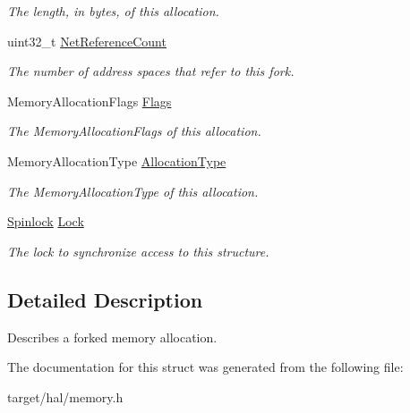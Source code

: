 \begin{DoxyCompactItemize}
\begin{DoxyCompactList}\small\item\em The length, in bytes, of this allocation. \end{DoxyCompactList}\item 
uint32\+\_\+t \hyperlink{structForkedMemoryData_a80dff83c77a4bc3c06adf45d527a60ca}{Net\+Reference\+Count}\hypertarget{structForkedMemoryData_a80dff83c77a4bc3c06adf45d527a60ca}{}\label{structForkedMemoryData_a80dff83c77a4bc3c06adf45d527a60ca}

\begin{DoxyCompactList}\small\item\em The number of address spaces that refer to this fork. \end{DoxyCompactList}\item 
Memory\+Allocation\+Flags \hyperlink{structForkedMemoryData_ac5805d0bfa244478530b93b81ca6978c}{Flags}\hypertarget{structForkedMemoryData_ac5805d0bfa244478530b93b81ca6978c}{}\label{structForkedMemoryData_ac5805d0bfa244478530b93b81ca6978c}

\begin{DoxyCompactList}\small\item\em The Memory\+Allocation\+Flags of this allocation. \end{DoxyCompactList}\item 
Memory\+Allocation\+Type \hyperlink{structForkedMemoryData_ab72120a66547e9d89b0b2afaf4815f26}{Allocation\+Type}\hypertarget{structForkedMemoryData_ab72120a66547e9d89b0b2afaf4815f26}{}\label{structForkedMemoryData_ab72120a66547e9d89b0b2afaf4815f26}

\begin{DoxyCompactList}\small\item\em The Memory\+Allocation\+Type of this allocation. \end{DoxyCompactList}\item 
\hyperlink{group__sync__hal_ga2b7bd1f01b65ccbfaee98f004746ae8b}{Spinlock} \hyperlink{structForkedMemoryData_a848f24734eb0c95d865ee9f336dad2d1}{Lock}\hypertarget{structForkedMemoryData_a848f24734eb0c95d865ee9f336dad2d1}{}\label{structForkedMemoryData_a848f24734eb0c95d865ee9f336dad2d1}

\begin{DoxyCompactList}\small\item\em The lock to synchronize access to this structure. \end{DoxyCompactList}\end{DoxyCompactItemize}


\subsection{Detailed Description}
Describes a forked memory allocation. 

The documentation for this struct was generated from the following file\+:\begin{DoxyCompactItemize}
\item 
target/hal/memory.\+h\end{DoxyCompactItemize}
